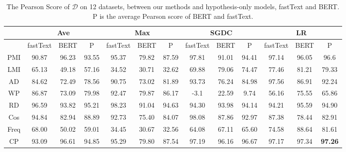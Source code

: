 \begin{table}[th]
\small
\centering
\begin{tabular}{ccccccccccccc}
\hline
     & \multicolumn{3}{c}{Ave}      & \multicolumn{3}{c}{Max}      & \multicolumn{3}{c}{SGDC}       & \multicolumn{3}{c}{LR}     \\ \hline
     & fastText & BERT & P     & fastText & BERT & P     & fastText & BERT & P     & fastText & BERT & P     \\ \hline
PMI  & 90.87       & 96.23   & 93.55 & 95.37       & 79.82   & 87.59 & 97.81       & 91.01   & 94.41 & 97.14       & 96.05   & 96.6  \\
LMI  & 65.13       & 49.18   & 57.16 & 34.52       & 30.71   & 32.62 & 69.88       & 79.06   & 74.47 & 77.46       & 81.21   & 79.33 \\
AD   & 84.62       & 72.49   & 78.56 & 90.75       & 73.02   & 81.89 & 93.73       & 76.24   & 84.98 & 97.56       & 86.91   & 92.24 \\
WP   & 86.87       & 73.09   & 79.98 & 92.47       & 79.87   & 86.17 & -3.1        & 22.59   & 9.74  & 56.16       & 75.55   & 65.86 \\
RD   & 96.59       & 93.82   & 95.21 & 98.23       & 91.04   & 94.63 & 94.30       & 93.98   & 94.14 & 94.21       & 95.59   & 94.90 \\
Cos  & 94.84       & 82.94   & 88.89 & 92.73       & 75.40   & 84.07 & 98.08       & 87.86   & 92.97 & 87.38       & 78.44   & 82.91 \\
Freq & 68.00       & 50.02   & 59.01 & 34.45       & 30.67   & 32.56 & 64.08       & 67.11   & 65.60 & 74.58       & 88.64   & 81.61 \\
CP   & 93.09        & 96.61   & 94.85 & 95.29       & 79.80   & 87.54 & 97.19       & 96.16   & 96.67 & 97.17       & 97.34   & \textbf{97.26} \\ \hline
\end{tabular}
\caption{\label{best_method} The Pearson Score of $\mathcal{D}$ on 12 datasets, between our methods and hypothesis-only models, fastText and BERT. 
P is the average Pearson score of BERT and fastText.}
\end{table}



